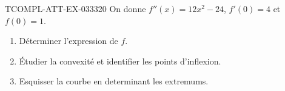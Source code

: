 \begin{exercice}{TCOMPL-ATT-EX-033}{3}{20}
On donne $f''(x) = 12x^2 - 24$, $f'(0) = 4$ et $f(0) = 1$.
\begin{enumerate}
  \item Déterminer l'expression de $f$.
  \item Étudier la convexité et identifier les points d'inflexion.
  \item Esquisser la courbe en determinant les extremums.
\end{enumerate}

\end{exercice}
